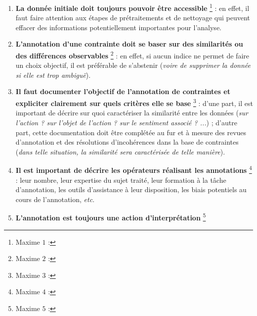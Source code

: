 		\begin{enumerate}
			\item \textbf{La donnée initiale doit toujours pouvoir être accessible} \footnote{
				Maxime $1$ : 
			} :
			en effet, il faut faire attention aux étapes de prétraitements et de nettoyage qui peuvent effacer des informations potentiellement importantes pour l'analyse.
			\item \textbf{L'annotation d'une contrainte doit se baser sur des similarités ou des différences observables} \footnote{
				Maxime $2$ : 
			} :
			en effet, si aucun indice ne permet de faire un choix objectif, il est préférable de s'abstenir (\textit{voire de supprimer la donnée si elle est trop ambiguë}).
			\item \textbf{Il faut documenter l'objectif de l'annotation de contraintes et expliciter clairement sur quels critères elle se base} \footnote{
				Maxime $3$ : 
			} :
			d'une part, il est important de décrire sur quoi caractériser la similarité entre les données (\textit{sur l'action ? sur l'objet de l'action ? sur le sentiment associé ? ...}) ;
			d'autre part, cette documentation doit être complétée au fur et à mesure des revues d'annotation et des résolutions d'incohérences dans la base de contraintes (\textit{dans telle situation, la similarité sera caractérisée de telle manière}).
			\item \textbf{Il est important de  décrire les opérateurs réalisant les annotations} \footnote{
				Maxime $4$ : 
			} :
			leur nombre, leur expertise du sujet traité, leur formation à la tâche d'annotation, les outils d'assistance à leur disposition, les biais potentiels au cours de l'annotation, \textit{etc}.
			\item \textbf{L'annotation est toujours une action d'interprétation} \footnote{
				Maxime $5$ : 
}
\end{enumerate}
